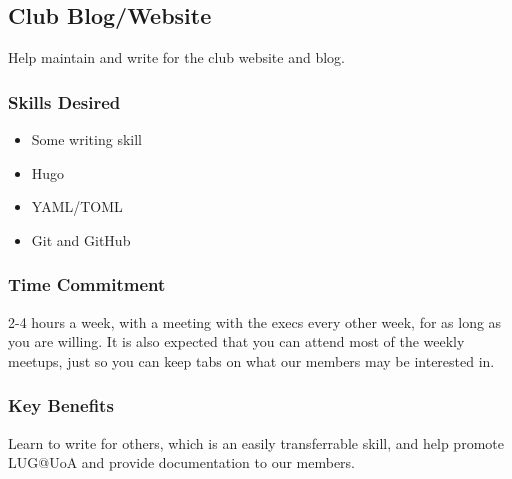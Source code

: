 \documentclass[../proposal-for-projects-2025.tex]{subfiles}
\begin{document}
\subsection{Club Blog/Website}

Help maintain and write for the club website and blog.

\subsubsection*{Skills Desired}

\begin{multicols}{2}
	\begin{itemize}
		\item Some writing skill
		\item Hugo
		\item YAML/TOML
		\item Git and GitHub
	\end{itemize}
\end{multicols}


\subsubsection*{Time Commitment}

2-4 hours a week, with a meeting with the execs every other week, for as long as you are willing. It is also expected that you can attend most of the weekly meetups, just so you can keep tabs on what our members may be interested in.

\subsubsection*{Key Benefits}

Learn to write for others, which is an easily transferrable skill, and help promote LUG@UoA and provide documentation to our members.
\end{document}
